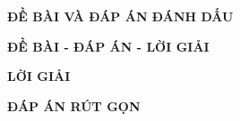 \documentclass[11pt]{article}
\begin{document}
\setlength{\columnsep}{10pt}
\setlength{\columnseprule}{0.5pt}
\lamtieude
\indebai
\begin{enumerate}[]
\foreachproblem[bttracnghiem]{\item\causo\thisproblem}
 \end{enumerate}

% 

\newpage
\setcounter{page}{1}
\lamtieude
\indebaidapan
\begin{center}
{\bf ĐỀ BÀI VÀ ĐÁP ÁN ĐÁNH DẤU}
\end{center}
\begin{enumerate}[]
\foreachproblem[bttracnghiem]{\item\causo\thisproblem}
\end{enumerate}
% 
\newpage
\setcounter{page}{1}
\lamtieude
\indebailoigiai
\begin{center}
{\bf ĐỀ BÀI - ĐÁP ÁN - LỜI GIẢI}
\end{center}
\begin{enumerate}[]
\foreachproblem[bttracnghiem]{\item\causo\thisproblem}
\end{enumerate}

\newpage
\setcounter{page}{1}
\lamtieude
\begin{center}
{\bf LỜI GIẢI}
\end{center}
\inloigiai
\begin{enumerate}[]
\foreachproblem[bttracnghiem]{\item\thisproblem}
\end{enumerate}
\setlength{\columnseprule}{0pt}

\newpage
\lamtieude
\indapanrutgon
\thispagestyle{empty}
\begin{center}
{\bf ĐÁP ÁN RÚT GỌN}
\end{center}
\begin{multicols}{3}
\begin{enumerate}[\causo]
 \foreachproblem[bttracnghiem]{\item\thisproblem}
\end{enumerate}
\end{multicols}
\end{document}
